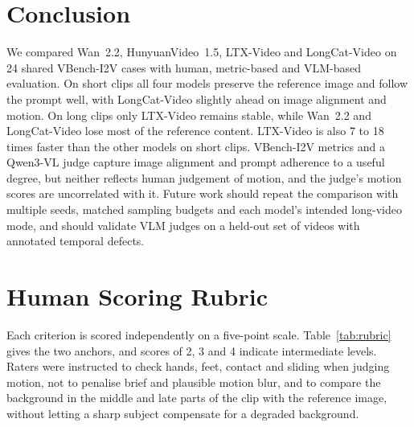 \documentclass[11pt,a4paper]{article}
\begin{document}
\section{Conclusion}
We compared Wan~2.2, HunyuanVideo~1.5, LTX-Video and LongCat-Video on 24 shared VBench-I2V cases with human, metric-based and VLM-based evaluation. On short clips all four models preserve the reference image and follow the prompt well, with LongCat-Video slightly ahead on image alignment and motion. On long clips only LTX-Video remains stable, while Wan~2.2 and LongCat-Video lose most of the reference content. LTX-Video is also 7 to 18 times faster than the other models on short clips. VBench-I2V metrics and a Qwen3-VL judge capture image alignment and prompt adherence to a useful degree, but neither reflects human judgement of motion, and the judge's motion scores are uncorrelated with it. Future work should repeat the comparison with multiple seeds, matched sampling budgets and each model's intended long-video mode, and should validate VLM judges on a held-out set of videos with annotated temporal defects.

{\small


}

\appendix

\section{Human Scoring Rubric}
\label{app:rubric}
Each criterion is scored independently on a five-point scale. Table~\ref{tab:rubric} gives the two anchors, and scores of 2, 3 and 4 indicate intermediate levels. Raters were instructed to check hands, feet, contact and sliding when judging motion, not to penalise brief and plausible motion blur, and to compare the background in the middle and late parts of the clip with the reference image, without letting a sharp subject compensate for a degraded background.
\end{document}
